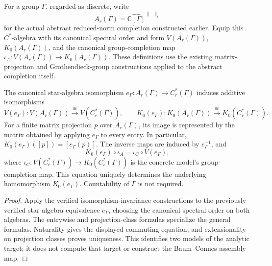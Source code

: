 \begin{definition}\label{def:abstract-analytic-k0}
\leanok
For a group $\Gamma$, regarded as discrete, write
\[
 A_r(\Gamma)=\widehat{\mathbb C[\Gamma]}^{\|\cdot\|_r}
\]
for the actual abstract reduced-norm completion constructed earlier.
Equip this $C^*$-algebra with its canonical spectral order and form
$V(A_r(\Gamma))$, $K_0(A_r(\Gamma))$, and the canonical group-completion
map $\iota_A:V(A_r(\Gamma))\to K_0(A_r(\Gamma))$.
These definitions use the existing matrix-projection and Grothendieck-group
constructions applied to the abstract completion itself.
\end{definition}

\begin{proposition}\label{prop:abstract-concrete-k0}
The canonical star-algebra isomorphism
$e_\Gamma:A_r(\Gamma)\to C_r^*(\Gamma)$ induces additive isomorphisms
\[
 V(e_\Gamma):V(A_r(\Gamma))\xrightarrow{\;\cong\;}V(C_r^*(\Gamma)),
 \qquad
 K_0(e_\Gamma):K_0(A_r(\Gamma))\xrightarrow{\;\cong\;}K_0(C_r^*(\Gamma)).
\]
For a finite matrix projection $p$ over $A_r(\Gamma)$, its image is represented
by the matrix obtained by applying $e_\Gamma$ to every entry. In particular,
$K_0(e_\Gamma)([p])=[e_\Gamma(p)]$.
The inverse maps are induced by $e_\Gamma^{-1}$, and
\[
 K_0(e_\Gamma)\circ\iota_A=\iota_C\circ V(e_\Gamma),
\]
where $\iota_C:V(C_r^*(\Gamma))\to K_0(C_r^*(\Gamma))$ is the concrete
model's group-completion map. This equation uniquely determines the underlying
homomorphism $K_0(e_\Gamma)$. Countability of $\Gamma$ is not required.
\end{proposition}
\begin{proof}
\leanok
Apply the verified isomorphism-invariance constructions to the previously
verified star-algebra equivalence $e_\Gamma$, choosing the canonical spectral
order on both algebras. The entrywise and projection-class formulas specialize
the general formulas. Naturality gives the displayed commuting equation, and
extensionality on projection classes proves uniqueness.
This identifies two models of the analytic target; it does not compute that
target or construct the Baum--Connes assembly map.
\end{proof}

